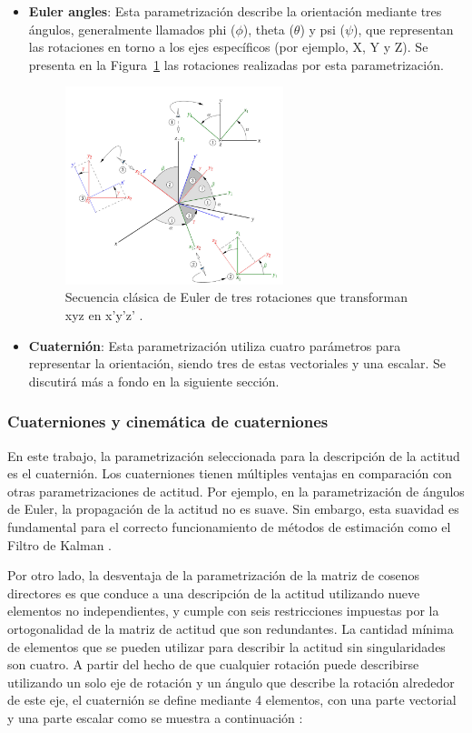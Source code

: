 \begin{itemize}
	\item \textbf{Euler angles}: Esta parametrización describe la orientación mediante tres ángulos, generalmente llamados phi ($\phi$), theta ($\theta$) y psi ($\psi$), que representan las rotaciones en torno a los ejes específicos (por ejemplo, X, Y y Z). Se presenta en la Figura~\ref{fig:euler_angles} las rotaciones realizadas por esta parametrización. 
	
	\begin{figure}[H]
		\centering    
		\includegraphics[width=0.6\textwidth]{euler_angles.png}
		\caption{Secuencia clásica de Euler de tres rotaciones que transforman xyz en x’y’z’ \cite{ref22}.}
		\label{fig:euler_angles}
	\end{figure}
	
	\item \textbf{Cuaternión}: Esta parametrización utiliza cuatro parámetros para representar la orientación, siendo tres de estas vectoriales y una escalar. Se discutirá más a fondo en la siguiente sección. 			
\end{itemize}

\subsubsection{Cuaterniones y cinemática de cuaterniones}

En este trabajo, la parametrización seleccionada para la descripción de la actitud es el cuaternión. Los cuaterniones tienen múltiples ventajas en comparación con otras parametrizaciones de actitud. Por ejemplo, en la parametrización de ángulos de Euler, la propagación de la actitud no es suave. Sin embargo, esta suavidad es fundamental para el correcto funcionamiento de métodos de estimación como el Filtro de Kalman \cite{ref23}.

Por otro lado, la desventaja de la parametrización de la matriz de cosenos directores es que conduce a una descripción de la actitud utilizando nueve elementos no independientes, y cumple con seis restricciones impuestas por la ortogonalidad de la matriz de actitud que son redundantes.
La cantidad mínima de elementos que se pueden utilizar para describir la actitud sin singularidades son cuatro. A partir del hecho de que cualquier rotación puede describirse utilizando un solo eje de rotación y un ángulo que describe la rotación alrededor de este eje, el cuaternión se define mediante 4 elementos, con una parte vectorial y una parte escalar como se muestra a continuación \cite{ref22}:

